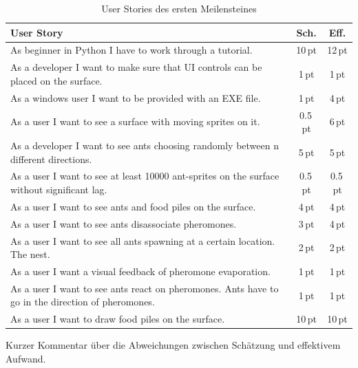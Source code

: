 \begin{table}[H]
\small\sffamily\renewcommand{\arraystretch}{1.5}
\begin{tabular}{| p{12cm} | c | c |}
  \hline
  \bfseries{User Story} & \bfseries{Sch.} & \bfseries{Eff.}  \\
  \hline
  As beginner in Python I have to work through a tutorial. & 10\,pt & 12\,pt \\
  \hline
  As a developer I want to make sure that UI controls can be placed on the surface. & 1\,pt &1\,pt \\
  \hline
  As a windows user I want to be provided with an EXE file. & 1\,pt &4\,pt \\
  \hline
  As a user I want to see a surface with moving sprites on it. & 0.5\,pt & 6\,pt \\
  \hline
  As a developer I want to see ants choosing randomly between n different directions. & 5\,pt & 5\,pt \\
  \hline
  As a user I want to see at least 10000 ant-sprites on the surface without significant lag. & 0.5\,pt & 0.5\,pt \\
  \hline
  As a user I want to see ants and food piles on the surface. & 4\,pt & 4\,pt \\
  \hline
  As a user I want to see ants disassociate pheromones. & 3\,pt & 4\,pt \\
  \hline
  As a user I want to see all ants spawning at a certain location. The nest. & 2\,pt & 2\,pt \\
  \hline
  As a user I want a visual feedback of pheromone evaporation. & 1\,pt & 1\,pt \\
  \hline
  As a user I want to see ants react on pheromones. Ants have to go in the direction of pheromones. & 1\,pt & 1\,pt \\
  \hline
  As a user I want to draw food piles on the surface. & 10\,pt & 10\,pt \\
  \hline
\end{tabular}
\captionsetup{type=table} %
\caption{User Stories des ersten Meilensteines}
\end{table}


\vspace*{0.5cm}


Kurzer Kommentar über die Abweichungen zwischen Schätzung und effektivem Aufwand. \\


\vspace*{1cm}



